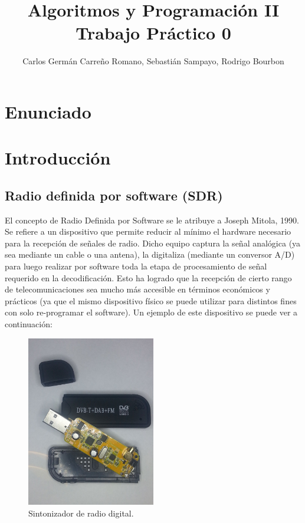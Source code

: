 \documentclass[10pt,a4paper]{article}
\title{Algoritmos y Programación II\\
Trabajo Práctico 0}
\author{Carlos Germán Carreño Romano, Sebastián Sampayo, Rodrigo Bourbon}
\begin{document}
\maketitle
\tableofcontents
\section{Enunciado}
\section{Introducción}


\subsection{Radio definida por software (SDR)}

El concepto de Radio Definida por Software se le atribuye a Joseph Mitola, 1990. Se refiere a un dispositivo que permite reducir al mínimo el hardware necesario para la recepción de señales de radio. Dicho equipo captura la señal analógica (ya sea mediante un cable o una antena), la digitaliza (mediante un conversor A/D) para luego realizar por software toda la etapa de procesamiento de señal requerido en la decodificación. Esto ha logrado que la recepción de cierto rango de telecomunicaciones sea mucho más accesible en términos económicos y prácticos (ya que el mismo dispositivo físico se puede utilizar para distintos fines con solo re-programar el software). Un ejemplo de este dispositivo se puede ver a continuación:

\begin{figure}[H]
\begin{centering}
\includegraphics[width=0.5\textwidth]{Imagenes/SDR.jpg}
\par\end{centering}

\caption{Sintonizador de radio digital.}


\end{figure}
\end{document}
